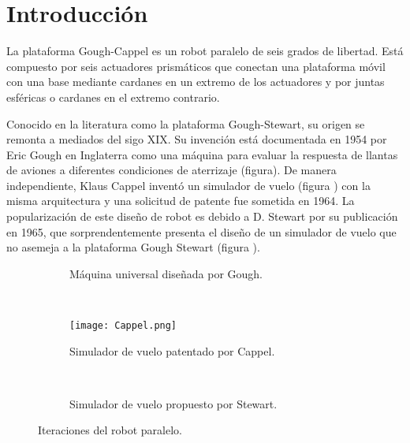 \section{Introducción}

La plataforma Gough-Cappel es un robot paralelo de seis grados de libertad.
Está compuesto por seis actuadores prismáticos que conectan una plataforma
móvil con una base mediante cardanes en un extremo de los actuadores y por
juntas esféricas o cardanes en el extremo contrario. 


Conocido en la literatura como la 
plataforma Gough-Stewart, su origen se remonta a mediados del sigo XIX.
Su invención está documentada en 1954 por Eric Gough 
\cite{gough} en Inglaterra como una máquina para 
evaluar la respuesta de llantas de aviones a diferentes 
condiciones de aterrizaje (figura). 
De manera independiente, Klaus Cappel inventó un simulador de vuelo (figura )
con la misma arquitectura y una solicitud de patente 
fue sometida en 1964.
La popularización de este diseño de robot es debido a D. Stewart 
por su publicación en 1965, que sorprendentemente presenta el
diseño de un simulador de vuelo que no asemeja a la 
plataforma Gough Stewart (figura ).



\begin{figure}[hb!]
    \centering
    \begin{subfigure}[b]{0.3\textwidth}
        \caption{Máquina universal diseñada por Gough.}
        \label{fig: gough robot}
    \end{subfigure}
    ~ %
    \begin{subfigure}[b]{0.3\textwidth}
         \texttt{[image: Cappel.png]}
        \caption{Simulador de vuelo patentado por Cappel.}
        \label{fig: cappel robot}
    \end{subfigure}
    ~ %
    \begin{subfigure}[b]{0.3\textwidth}
        \caption{Simulador de vuelo propuesto por Stewart.}
        \label{fig: stewart robot}
    \end{subfigure}
    \caption{Iteraciones del robot paralelo.}\label{fig: parallel robots}
\end{figure}

